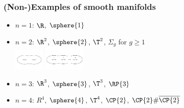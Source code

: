 \begin{frame}
  \frametitle{(Non-)Examples of smooth manifolds}
  \begin{itemize}
  \item $n=1$: $\R$, $\sphere{1}$ %
  \item $n=2$: $\R^2$, $\sphere{2}$, $\T^2$, $\Sigma_g$ for $g\geq 1$\\
  \includegraphics[width=1.5cm]{images/surface_genus_2.png}
  \includegraphics[width=2cm]{images/surface_genus_g.png}
  \item $n=3$: $\R^3$, $\sphere{3}$, $\T^3$, $\RP{3}$
  \item $n=4$: $R^4$, $\sphere{4}$, $\T^4$, $\CP{2}$, $\CP{2}\#\overline{\CP{2}}$
  \end{itemize}
\end{frame}


